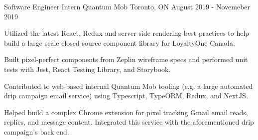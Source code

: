 

\begin{cventries}

  \cventry
    {Software Engineer Intern} %
    {Quantum Mob} %
    {Toronto, ON} %
    {August 2019 - Novemeber 2019} %
    {
      \begin{cvitems} %
        \item {Utilized the latest React, Redux and server side rendering best practices to help build a large scale closed-source component library for LoyaltyOne Canada.}
        \item {Built pixel-perfect components from Zeplin wireframe specs and performed unit tests with Jest, React Testing Library, and Storybook.}
        \item {Contributed to web-based internal Quantum Mob tooling (e.g. a large automated drip campaign email service) using Typescript, TypeORM, Redux, and NextJS.}
         \item {Helped build a complex Chrome extension for pixel tracking Gmail email reads, replies, and message content. Integrated this service with the aforementioned drip campaign's back end.}
      \end{cvitems}
    }


\end{cventries}
